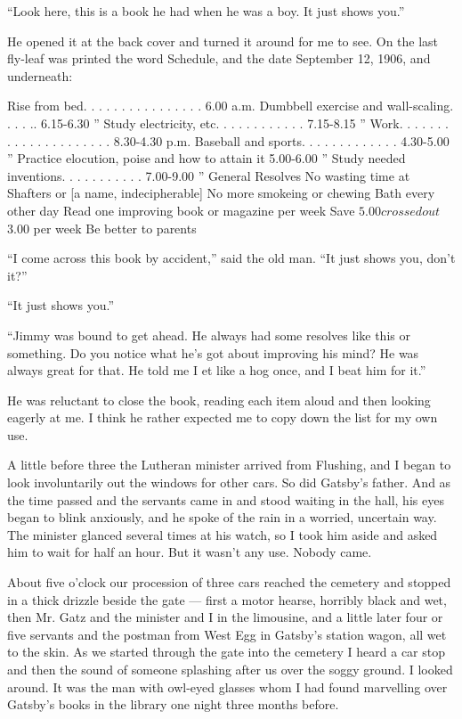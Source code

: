 \documentclass{znotebook}
\begin{document}
``Look here, this is a book he had when he was a boy. It just shows you.''

He opened it at the back cover and turned it around for me to see. On the last fly-leaf was printed the word Schedule, and the date September 12, 1906, and underneath:

Rise from bed. . . . . . . . . . . . . . . .	6.00 a.m.
Dumbbell exercise and wall-scaling. . . . ..	6.15-6.30 ''
Study electricity, etc. . . . . . . . . . . .	7.15-8.15 ''
Work. . . . . . . . . . . . . . . . . . . . .	8.30-4.30 p.m.
Baseball and sports. . . . . . . . . . . . .	4.30-5.00 ''
Practice elocution, poise and how to attain it	5.00-6.00 ''
Study needed inventions. . . . . . . . . . .	7.00-9.00 ''
General Resolves No wasting time at Shafters or [a name, indecipherable] No more smokeing or chewing Bath every other day Read one improving book or magazine per week Save $5.00 {crossed out} $3.00 per week Be better to parents

``I come across this book by accident,'' said the old man. ``It just shows you, don't it?''

``It just shows you.''

``Jimmy was bound to get ahead. He always had some resolves like this or something. Do you notice what he's got about improving his mind? He was always great for that. He told me I et like a hog once, and I beat him for it.''

He was reluctant to close the book, reading each item aloud and then looking eagerly at me. I think he rather expected me to copy down the list for my own use.

A little before three the Lutheran minister arrived from Flushing, and I began to look involuntarily out the windows for other cars. So did Gatsby's father. And as the time passed and the servants came in and stood waiting in the hall, his eyes began to blink anxiously, and he spoke of the rain in a worried, uncertain way. The minister glanced several times at his watch, so I took him aside and asked him to wait for half an hour. But it wasn't any use. Nobody came.

About five o'clock our procession of three cars reached the cemetery and stopped in a thick drizzle beside the gate — first a motor hearse, horribly black and wet, then Mr. Gatz and the minister and I in the limousine, and a little later four or five servants and the postman from West Egg in Gatsby's station wagon, all wet to the skin. As we started through the gate into the cemetery I heard a car stop and then the sound of someone splashing after us over the soggy ground. I looked around. It was the man with owl-eyed glasses whom I had found marvelling over Gatsby's books in the library one night three months before.
\end{document}
